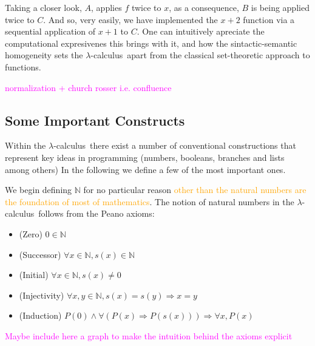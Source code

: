 \documentclass[12pt]{book}
\newcommand{\la}{\lambda}
\newcommand{\NAT}{\mathbb{N}}
\newcommand{\lcalc}{$\la$-calculus}
\newcommand{\orange}[1]{\textcolor{orange}{#1}}
\newcommand{\magenta}[1]{\textcolor{magenta}{#1}}
\theoremstyle{plain}
\theoremstyle{definition}
\theoremstyle{definition}
\theoremstyle{definition}
\begin{document}
Taking a closer look, $A$, applies $f$ twice to $x$, as a consequence, $B$ is being applied twice to $C$. And so, very easily, we have implemented the $ x + 2 $ function via a sequential application of $x + 1$ to $C$. One can intuitively apreciate the computational expresivenes this brings with it, and how the sintactic-semantic homogeneity sets the \lcalc \ apart from the classical set-theoretic approach to functions.

\magenta{normalization + church rosser i.e. confluence}

\subsection{\centering Some Important Constructs}

Within the \lcalc \ there exist a number of conventional constructions that represent key ideas in programming (numbers, booleans, branches and lists among others) In the following we define a few of the most important ones.

We begin defining $ \mathbb{N} $ for no particular reason \orange{other than the natural numbers are the foundation of most of mathematics}. The notion of natural numbers in the \lcalc \ follows from the Peano axioms:
\begin{itemize}
\item (Zero) \( 0 \in \NAT \)
\item (Successor) \( \forall x \in \NAT, s(x) \in \NAT \)
\item (Initial) \( \forall x \in \NAT, s(x) \neq 0 \)
\item (Injectivity) \( \forall x, y \in \NAT, s(x) = s(y) \Rightarrow x = y \)
\item (Induction) \( P(0) \land \forall ( P(x) \Rightarrow P(s(x))) \Rightarrow \forall x,  P (x) \)
\end{itemize}
\magenta{Maybe include here a graph to make the intuition behind the axioms explicit}
\end{document}
